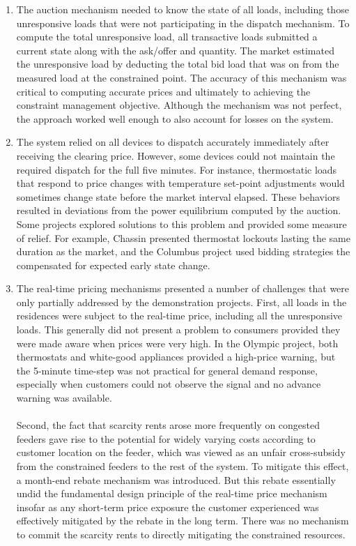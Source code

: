 \begin{enumerate}
    
    \item The auction mechanism needed to know the state of all loads, including those unresponsive loads that were not participating in the dispatch mechanism.  To compute the total unresponsive load, all transactive loads submitted a current state along with the ask/offer and quantity.  The market estimated the unresponsive load by deducting the total bid load that was on from the measured load at the constrained point.  The accuracy of this mechanism was critical to computing accurate prices and ultimately to achieving the constraint management objective.  Although the mechanism was not perfect, the approach worked well enough to also account for losses on the system.

    \item The system relied on all devices to dispatch accurately immediately after receiving the clearing price. However, some devices could not maintain the required dispatch for the full five minutes.  For instance, thermostatic loads that respond to price changes with temperature set-point adjustments would sometimes change state before the market interval elapsed. These behaviors resulted in deviations from the power equilibrium computed by the auction. Some projects explored solutions to this problem and provided some measure of relief.  For example, Chassin \cite{chassin2015} presented thermostat lockouts lasting the same duration as the market, and the Columbus project used bidding strategies the compensated for expected early state change.
    
    \item The real-time pricing mechanisms presented a number of challenges that were only partially addressed by the demonstration projects.  First, all loads in the residences were subject to the real-time price, including all the unresponsive loads.  This generally did not present a problem to consumers provided they were made aware when prices were very high.  In the Olympic project, both thermostats and white-good appliances provided a high-price warning, but the 5-minute time-step was not practical for general demand response, especially when customers could not observe the signal and no advance warning was available.  
    \\~\\
    Second, the fact that scarcity rents arose more frequently on congested feeders gave rise to the potential for widely varying costs according to customer location on the feeder, which was viewed as an unfair cross-subsidy from the constrained feeders to the rest of the system.  To mitigate this effect, a month-end rebate mechanism was introduced. But this rebate essentially undid the fundamental design principle of the real-time price mechanism insofar as any short-term price exposure the customer experienced was effectively mitigated by the rebate in the long term. There was no mechanism to commit the scarcity rents to directly mitigating the constrained resources.
    
\end{enumerate}

